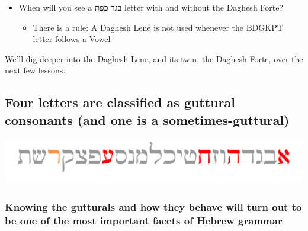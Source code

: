 \documentclass[
]{turabian-researchpaper}
\providecommand{\tightlist}{%
  \setlength{\itemsep}{0pt}\setlength{\parskip}{0pt}}
\begin{document}
\begin{itemize}
\tightlist
\item
  When will you see a בגד כפת letter with and without the Daghesh Forte?

  \begin{itemize}
  \tightlist
  \item
    There is a rule: A Daghesh Lene is not used whenever the BDGKPT letter follows a Vowel
  \end{itemize}
\end{itemize}

We'll dig deeper into the Daghesh Lene, and its twin, the Daghesh Forte, over the next few lessons.

\hypertarget{one_5}{%
\subsection{Four letters are classified as guttural consonants (and one is a sometimes-guttural)}\label{one_5}}

\begin{center}\includegraphics[width=500pt]{images/gutturals} \end{center}

\hypertarget{knowing-the-gutturals-and-how-they-behave-will-turn-out-to-be-one-of-the-most-important-facets-of-hebrew-grammar}{%
\subsubsection*{Knowing the gutturals and how they behave will turn out to be one of the most important facets of Hebrew grammar}\label{knowing-the-gutturals-and-how-they-behave-will-turn-out-to-be-one-of-the-most-important-facets-of-hebrew-grammar}}
\end{document}
